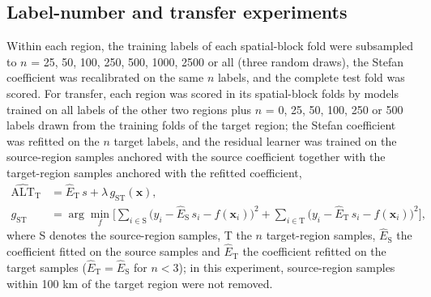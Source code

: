 \subsection{Label-number and transfer experiments}
Within each region, the training labels of each spatial-block fold were subsampled to $n$ = 25, 50, 100, 250, 500, 1000, 2500 or all (three random draws), the Stefan coefficient was recalibrated on the same $n$ labels, and the complete test fold was scored. For transfer, each region was scored in its spatial-block folds by models trained on all labels of the other two regions plus $n$ = 0, 25, 50, 100, 250 or 500 labels drawn from the training folds of the target region; the Stefan coefficient was refitted on the $n$ target labels, and the residual learner was trained on the source-region samples anchored with the source coefficient together with the target-region samples anchored with the refitted coefficient,
\begin{equation}
\begin{aligned}
\widehat{\mathrm{ALT}}_{\mathrm{T}} &= \hat{E}_{\mathrm{T}}\, s + \lambda\, g_{\mathrm{ST}}(\mathbf{x}), \\
g_{\mathrm{ST}} &= \arg\min_{f} \Big[ \sum_{i \in \mathrm{S}} \big( y_i - \hat{E}_{\mathrm{S}}\, s_i - f(\mathbf{x}_i) \big)^{2} + \sum_{i \in \mathrm{T}} \big( y_i - \hat{E}_{\mathrm{T}}\, s_i - f(\mathbf{x}_i) \big)^{2} \Big],
\end{aligned}
\label{eq:transfer}
\end{equation}
where S denotes the source-region samples, T the $n$ target-region samples, $\hat{E}_{\mathrm{S}}$ the coefficient fitted on the source samples and $\hat{E}_{\mathrm{T}}$ the coefficient refitted on the target samples ($\hat{E}_{\mathrm{T}} = \hat{E}_{\mathrm{S}}$ for $n < 3$); in this experiment, source-region samples within 100 km of the target region were not removed.


